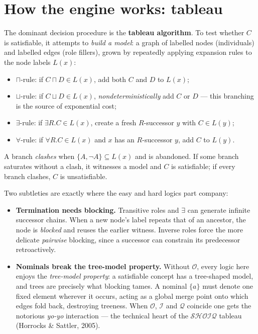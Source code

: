 \documentclass[11pt]{article}
\newcommand{\dl}[1]{\ensuremath{\mathcal{#1}}}%
\newcommand{\inter}{\sqcap}
\newcommand{\unin}{\sqcup}
\theoremstyle{definition}
\begin{document}
\section{How the engine works: tableau}

The dominant decision procedure is the \textbf{tableau algorithm}. To test
whether $C$ is satisfiable, it attempts to \emph{build a model}: a graph of
labelled nodes (individuals) and labelled edges (role fillers), grown by
repeatedly applying expansion rules to the node labels $L(x)$:
\begin{itemize}[nosep]
  \item $\inter$-rule: if $C \inter D \in L(x)$, add both $C$ and $D$ to $L(x)$;
  \item $\unin$-rule: if $C \unin D \in L(x)$, \emph{nondeterministically} add
        $C$ or $D$ --- this branching is the source of exponential cost;
  \item $\exists$-rule: if $\exists R.C \in L(x)$, create a fresh $R$-successor
        $y$ with $C \in L(y)$;
  \item $\forall$-rule: if $\forall R.C \in L(x)$ and $x$ has an $R$-successor
        $y$, add $C$ to $L(y)$.
\end{itemize}
A branch \emph{clashes} when $\{A, \lnot A\} \subseteq L(x)$ and is abandoned.
If some branch saturates without a clash, it witnesses a model and $C$ is
satisfiable; if every branch clashes, $C$ is unsatisfiable.

Two subtleties are exactly where the easy and hard logics part company:
\begin{itemize}[nosep]
  \item \textbf{Termination needs blocking.} Transitive roles and $\exists$
        can generate infinite successor chains. When a new node's label repeats
        that of an ancestor, the node is \emph{blocked} and reuses the earlier
        witness. Inverse roles force the more delicate \emph{pairwise} blocking,
        since a successor can constrain its predecessor retroactively.
  \item \textbf{Nominals break the tree-model property.} Without $\dl{O}$,
        every logic here enjoys the \emph{tree-model property}: a satisfiable
        concept has a tree-shaped model, and trees are precisely what blocking
        tames. A nominal $\{a\}$ must denote one fixed element wherever it
        occurs, acting as a global merge point onto which edges fold back,
        destroying treeness. When $\dl{O}$, $\dl{I}$ and $\dl{Q}$ coincide one
        gets the notorious \emph{yo-yo} interaction --- the technical heart of
        the $\dl{SHOIQ}$ tableau (Horrocks \& Sattler, 2005).
\end{itemize}
\end{document}

